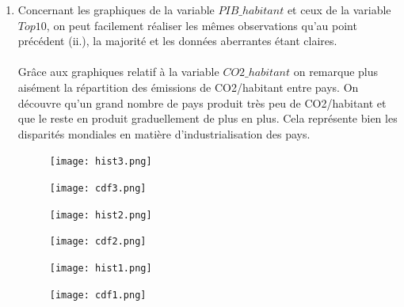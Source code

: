 \documentclass[a4paper, 11pt]{article}
\begin{document}
\begin{enumerate}[label=(\alph*)]
\begin{enumerate}[label=\roman*.]
        \newpage
        \item Concernant les graphiques de la variable $PIB\_habitant$ et ceux de la variable $Top10$, on peut facilement réaliser les mêmes observations qu'au point précédent (ii.), la majorité et les données aberrantes étant claires.
        \\
        \\
        Grâce aux graphiques relatif à la variable $CO2\_habitant$ on remarque plus aisément la répartition des émissions de CO2/habitant entre pays. On découvre qu'un grand nombre de pays produit très peu de CO2/habitant et que le reste en produit graduellement de plus en plus. Cela représente bien les disparités mondiales en matière d'industrialisation des pays.
    \begin{figure}[h!]
    \begin{minipage}{.5\textwidth}
        \centering
        \texttt{[image: hist3.png]}
        \caption{}
        \label{Débit_frottement}
    \end{minipage}
    \hspace{0.55cm}
    \begin{minipage}{.5\textwidth}
        \centering
        \texttt{[image: cdf3.png]}
        \caption{}
        \label{Pression_frottement}
    \end{minipage}
\end{figure}
\begin{figure}[h!]
    \begin{minipage}{.5\textwidth}
        \centering
        \texttt{[image: hist2.png]}
        \caption{}
        \label{Débit_frottement}
    \end{minipage}
    \hspace{0.55cm}
    \begin{minipage}{.5\textwidth}
        \centering
        \texttt{[image: cdf2.png]}
        \caption{}
        \label{Pression_frottement}
    \end{minipage}
\end{figure}
\begin{figure}[h!]
    \begin{minipage}{.5\textwidth}
        \centering
        \texttt{[image: hist1.png]}
        \caption{}
        \label{Débit_frottement}
    \end{minipage}
    \hspace{0.55cm}
    \begin{minipage}{.5\textwidth}
        \centering
        \texttt{[image: cdf1.png]}
        \caption{}
        \label{Pression_frottement}

\end{minipage}
\end{figure}
\end{enumerate}
\end{enumerate}
\end{document}
